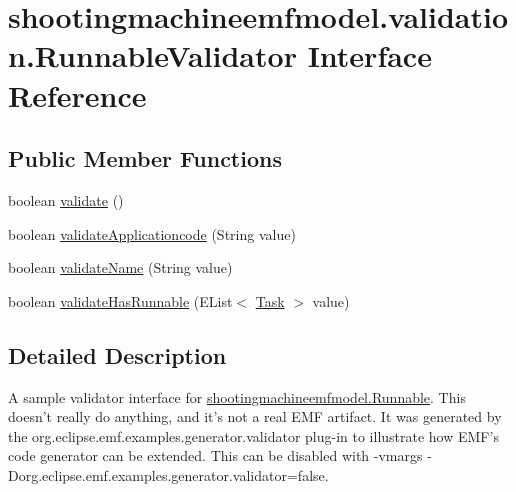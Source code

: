 \hypertarget{interfaceshootingmachineemfmodel_1_1validation_1_1_runnable_validator}{\section{shootingmachineemfmodel.\-validation.\-Runnable\-Validator Interface Reference}
\label{interfaceshootingmachineemfmodel_1_1validation_1_1_runnable_validator}
}
\subsection*{Public Member Functions}
\begin{DoxyCompactItemize}
\item 
boolean \hyperlink{interfaceshootingmachineemfmodel_1_1validation_1_1_runnable_validator_a4fc833e513d9cb2f7b1186994f73fe0b}{validate} ()
\item 
boolean \hyperlink{interfaceshootingmachineemfmodel_1_1validation_1_1_runnable_validator_ad331b9b3f73821027652db3aab722fa4}{validate\-Applicationcode} (String value)
\item 
boolean \hyperlink{interfaceshootingmachineemfmodel_1_1validation_1_1_runnable_validator_a94d5787ff09b2c17c2843209d9dcf2b7}{validate\-Name} (String value)
\item 
boolean \hyperlink{interfaceshootingmachineemfmodel_1_1validation_1_1_runnable_validator_ae50fd0632708053c0b9149dfe1c81da4}{validate\-Has\-Runnable} (E\-List$<$ \hyperlink{interfaceshootingmachineemfmodel_1_1_task}{Task} $>$ value)
\end{DoxyCompactItemize}


\subsection{Detailed Description}
A sample validator interface for \hyperlink{interfaceshootingmachineemfmodel_1_1_runnable}{shootingmachineemfmodel.\-Runnable}. This doesn't really do anything, and it's not a real E\-M\-F artifact. It was generated by the org.\-eclipse.\-emf.\-examples.\-generator.\-validator plug-\/in to illustrate how E\-M\-F's code generator can be extended. This can be disabled with -\/vmargs -\/\-Dorg.\-eclipse.\-emf.\-examples.\-generator.\-validator=false. 

